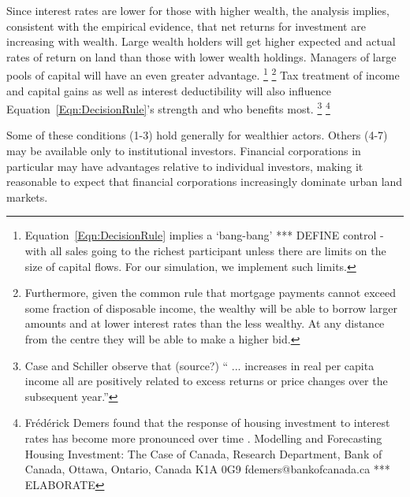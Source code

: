 Since interest rates are lower for those with higher wealth, the analysis implies, consistent with the empirical evidence, that net returns for investment are increasing with wealth. Large wealth holders will get higher expected and actual rates of return on land than those with lower wealth holdings. Managers of large pools of capital will have an even greater advantage. \footnote{ Equation~\ref{Eqn:DecisionRule} implies a `bang-bang' *** DEFINE control - with all sales going to the richest participant unless there are limits on the size of capital flows. For our simulation, we implement such limits. } \footnote{Furthermore, given the  common rule that mortgage payments cannot exceed some fraction of disposable income, the wealthy will be able to borrow larger amounts and at lower interest rates than the less wealthy. At any distance from the centre they will be able to make a higher bid.} %
Tax treatment of income and capital gains as well as interest deductibility will also influence Equation~\ref{Eqn:DecisionRule}'s strength and who benefits most. \footnote{Case and Schiller \cite{CaseandSchiller} observe that (source?) 
`` ... increases in real per capita income all are positively related to excess returns or price changes over the subsequent year.''} 
\footnote{Fr\'ed\'erick Demers found that the response of housing investment to interest rates has become more pronounced over time \cite{FredrickDemers}. Modelling and Forecasting Housing Investment: The Case of Canada,  Research Department, Bank of Canada, Ottawa, Ontario, Canada K1A 0G9 fdemers@bankofcanada.ca *** ELABORATE} 

Some  of these conditions (1-3) hold generally for wealthier actors. Others (4-7) may be available only to institutional investors.  Financial corporations in particular may have advantages relative to individual investors, making it  reasonable to expect that financial corporations increasingly dominate urban land markets. %


